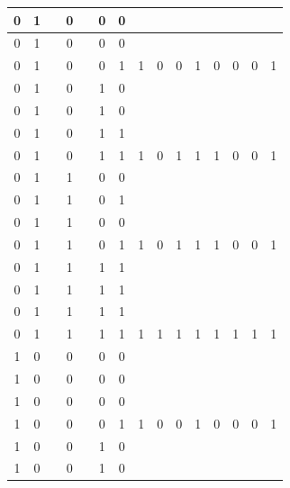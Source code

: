 \begin{table}[!tb]
\begin{tabular}{|c|c|c|c|c|c|c|c|c|c|c|c|c|c|c|}
        \rowcolor{yellow!40} 0 & 1 &  & 0 &  & 0 & 0 &  &  &  &  &  &  &  &  \\ \hline
        \rowcolor{yellow!40} 0 & 1 &  & 0 &  & 0 & 0 &  &  &  &  &  &  &  &  \\ \hline
        \rowcolor{yellow!40} 0 & 1 &  & 0 &  & 0 & 1 & 1 & 0 & 0 & 1 & 0 & 0 & 0 & 1 \\ \hline
        \rowcolor{gray!40} 0 & 1 &  & 0 &  & 1 & 0 &  &  &  &  &  &  &  &  \\ \hline
        \rowcolor{gray!40} 0 & 1 &  & 0 &  & 1 & 0 &  &  &  &  &  &  &  &  \\ \hline
        \rowcolor{gray!40} 0 & 1 &  & 0 &  & 1 & 1 &  &  &  &  &  &  &  &  \\ \hline
        \rowcolor{gray!40} 0 & 1 &  & 0 &  & 1 & 1 & 1 & 0 & 1 & 1 & 1 & 0 & 0 & 1 \\ \hline
        \rowcolor{blue!40} 0 & 1 &  & 1 &  & 0 & 0 &  &  &  &  &  &  &  &  \\ \hline
        \rowcolor{blue!40} 0 & 1 &  & 1 &  & 0 & 1 &  &  &  &  &  &  &  &  \\ \hline
        \rowcolor{blue!40} 0 & 1 &  & 1 &  & 0 & 0 &  &  &  &  &  &  &  &  \\ \hline
        \rowcolor{blue!40} 0 & 1 &  & 1 &  & 0 & 1 & 1 & 0 & 1 & 1 & 1 & 0 & 0 & 1 \\ \hline
        \rowcolor{red!40} 0 & 1 &  & 1 &  & 1 & 1 &  &  &  &  &  &  &  &  \\ \hline
        \rowcolor{red!40} 0 & 1 &  & 1 &  & 1 & 1 &  &  &  &  &  &  &  &  \\ \hline
        \rowcolor{red!40} 0 & 1 &  & 1 &  & 1 & 1 &  &  &  &  &  &  &  &  \\ \hline
        \rowcolor{red!40} 0 & 1 &  & 1 &  & 1 & 1 & 1 & 1 & 1 & 1 & 1 & 1 & 1 & 1 \\ \hline
        \rowcolor{green!40} 1 & 0 &  & 0 &  & 0 & 0 &  &  &  &  &  &  &  &  \\ \hline
        \rowcolor{green!40} 1 & 0 &  & 0 &  & 0 & 0 &  &  &  &  &  &  &  &  \\ \hline
        \rowcolor{green!40} 1 & 0 &  & 0 &  & 0 & 0 &  &  &  &  &  &  &  &  \\ \hline
        \rowcolor{green!40} 1 & 0 &  & 0 &  & 0 & 1 & 1 & 0 & 0 & 1 & 0 & 0 & 0 & 1 \\ \hline
        \rowcolor{yellow!40} 1 & 0 &  & 0 &  & 1 & 0 &  &  &  &  &  &  &  &  \\ \hline
        \rowcolor{yellow!40} 1 & 0 &  & 0 &  & 1 & 0 &  &  &  &  &  &  &  &  \\ \hline

\end{tabular}
\end{table}
